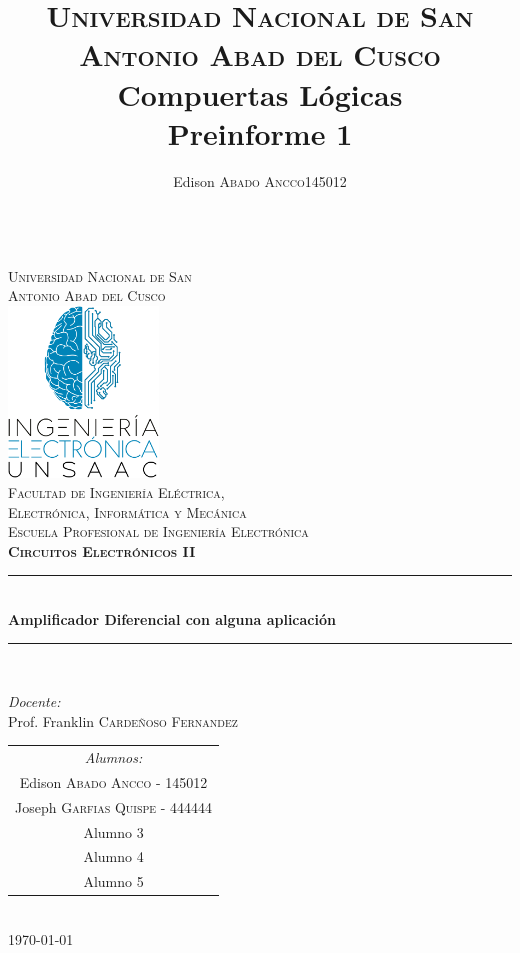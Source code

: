 \documentclass[a4paper]{article} %
\title{
	\textsc{Universidad Nacional de San Antonio Abad del Cusco}\\
	\textbf{Compuertas Lógicas}\\
	Preinforme 1}
\author{
	\begin{tabular}{lr}
		Edison \textsc{Abado Ancco} & 145012 \\
	\end{tabular}
}
\begin{document}
	\begin{titlepage}
		\newcommand{\HRule}{\rule{\linewidth}{0.5mm}} 
		\center
		\textsc{\LARGE \vspace{1.1cm} \\ Universidad Nacional de San \\[0.2cm] Antonio Abad del Cusco}\\[1.2cm] 
		\includegraphics[width=4cm]{IMAGENES/logoLiC}\\[1cm]
		\textsc{\Large Facultad de Ingeniería Eléctrica, \\ Electrónica, Informática y Mecánica}\\[0.5cm] 
		\textsc{\large Escuela Profesional de Ingeniería Electrónica}\\[0.5cm]
		\textsc{\Large \textbf{Circuitos Electrónicos II}}\\[0.5cm] 
		\HRule \\[0.4cm]
		{ \huge \bfseries Amplificador Diferencial con alguna aplicación}\\[0.30cm] 
		\HRule \\[1.4cm]
		\begin{minipage}{\textwidth}
			\center 
			
			\emph{Docente:} \\
			Prof. Franklin  \textsc{Cardeñoso Fernandez} \\[1cm]
			
			\begin{tabular}{c}
				\emph{Alumnos:}  \\
				Edison   \textsc{Abado Ancco} - 145012 \\
				Joseph \textsc{Garfias Quispe} - 444444 \\
				Alumno 3 \\
				Alumno 4 \\
				Alumno 5
			\end{tabular}
		\end{minipage}\\[2cm]
		\today
	\end{titlepage}
	
\end{document}
